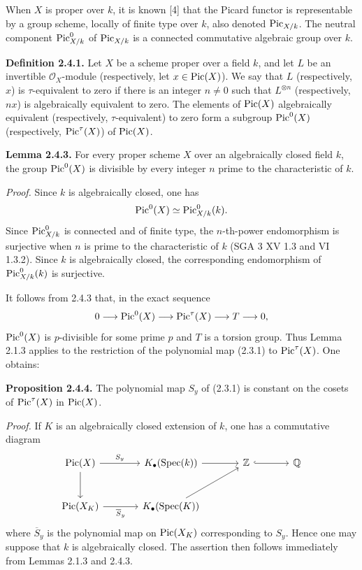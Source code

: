 When $X$ is proper over $k$, it is known [4] that the Picard functor is
representable by a group scheme, locally of finite type over $k$, also denoted
$\operatorname{Pic}_{X/k}$. The neutral component $\operatorname{Pic}^0_{X/k}$ of $\operatorname{Pic}_{X/k}$ is a
connected commutative algebraic group over $k$.

\textbf{Definition 2.4.1.}
Let $X$ be a scheme proper over a field $k$, and let $L$ be an invertible
$\mathcal O_X$-module (respectively, let $x\in\operatorname{Pic}(X)$). We say that $L$
(respectively, $x$) is $\tau$-equivalent to zero if there is an integer
$n\ne0$ such that $L^{\otimes n}$ (respectively, $nx$) is algebraically
equivalent to zero. The elements of $\operatorname{Pic}(X)$ algebraically equivalent
(respectively, $\tau$-equivalent) to zero form a subgroup $\operatorname{Pic}^0(X)$
(respectively, $\operatorname{Pic}^\tau(X)$) of $\operatorname{Pic}(X)$.

\textbf{Lemma 2.4.3.}
For every proper scheme $X$ over an algebraically closed field $k$, the group
$\operatorname{Pic}^0(X)$ is divisible by every integer $n$ prime to the characteristic of
$k$.

\emph{Proof.}
Since $k$ is algebraically closed, one has
\[
\operatorname{Pic}^0(X)\simeq\operatorname{Pic}^0_{X/k}(k).
\]
Since $\operatorname{Pic}^0_{X/k}$ is connected and of finite type, the $n$-th-power
endomorphism is surjective when $n$ is prime to the characteristic of $k$
(SGA 3 XV 1.3 and VI 1.3.2). Since $k$ is algebraically closed, the
corresponding endomorphism of $\operatorname{Pic}^0_{X/k}(k)$ is surjective.

It follows from 2.4.3 that, in the exact sequence
\[
0\longrightarrow\operatorname{Pic}^0(X)\longrightarrow\operatorname{Pic}^\tau(X)
\longrightarrow T\longrightarrow0,
\]
$\operatorname{Pic}^0(X)$ is $p$-divisible for some prime $p$ and $T$ is a torsion group.
Thus Lemma 2.1.3 applies to the restriction of the polynomial map (2.3.1) to
$\operatorname{Pic}^\tau(X)$. One obtains:

\textbf{Proposition 2.4.4.}
The polynomial map $S_y$ of (2.3.1) is constant on the cosets of
$\operatorname{Pic}^\tau(X)$ in $\operatorname{Pic}(X)$.

\emph{Proof.}
If $K$ is an algebraically closed extension of $k$, one has a commutative
diagram
\[
\begin{tikzcd}[column sep=large,row sep=large]
\Pic(X) \arrow[r,"S_y"] \arrow[d] &
K_\bullet(\Spec(k)) \arrow[r] &
\mathbb Z \arrow[r,hook] & \mathbb Q\\
\Pic(X_K) \arrow[r,"\overline S_y"'] &
K_\bullet(\Spec(K)) \arrow[ur] &&
\end{tikzcd}
\]
where $\overline S_y$ is the polynomial map on $\operatorname{Pic}(X_K)$ corresponding to
$S_y$. Hence one may suppose that $k$ is algebraically closed. The
assertion then follows immediately from Lemmas 2.1.3 and 2.4.3.

